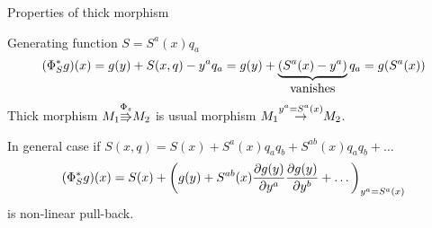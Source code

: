 \documentclass{beamer}
\def\p{\partial}
\def\p {\partial}
\begin{document}
\begin{frame}{Properties of thick morphism}
\begin{example}
   Generating function $S=S^a(x)q_a$
            $$
    (\Phi_S^*g)(x)=g(y)+S(x,q)-y^aq_a=g(y)+
   \underbrace{(S^a(x)-y^a)}_{\hbox{vanishes}}q_a=g(S^a(x))
            $$ 
  Thick morphism $M_1{\buildrel \Phi_s\over\Rrightarrow} M_2$
 is usual morphism $M_1{\buildrel y^a=S^a(x)\over \rightarrow}M_2$.
\end{example}
In general case if  $S(x,q)=S(x)+S^a(x)q_aq_b+S^{ab}(x)q_aq_b+\dots$
     $$
(\Phi_S^* g)(x)=S(x)+\left(g(y)+S^{ab}(x)
                             {\p g(y)\over \p y^a }
                             {\p g(y)\over \p y^b}+\dots\right)_
                           {y^a=S^a(x)}
     $$
is non-linear pull-back. 
  
\end{frame}
\end{document}
